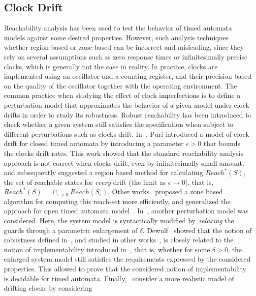 \subsection{Clock Drift}

Reachability analysis has been used to test the behavior
of timed automata models against some desired properties. However, such analysis
techniques whether region-based or zone-based can be incorrect and misleading,
since they rely on several assumptions such as zero response times or infinitesimally  
precise clocks, which is generally not the case in reality. In practice, clocks are 
implemented using an oscillator and a counting register, and their precision based on 
the quality of the oscillator together with the operating environment.
The common practice when studying the effect of clock imperfections is to define a perturbation
model that approximates the behavior of a given model under clock drifts in order to study its 
robustness. 
Robust reachability has been introduced to check whether a given
system still satisfies the specification when
subject to different perturbations such as clocks drift.
In~\cite{drift:puri}, Puri introduced a model of clock drift for closed timed automata
by introducing a parameter $\epsilon>0$ that bounds the clocks drift rates.
This work showed that the standard reachability analysis approach is not correct
when clocks drift, even by infinitesimally small amount, and subsequently suggested a region based
method for calculating $Reach^*(S)$, the set of reachable states for \emph{every} drift 
(the limit as $\epsilon\to 0$),
that is, $Reach^*(S)=\cap_{\epsilon>0} Reach(S_{\epsilon})$. Other 
works~\cite{drift:conrad,drift:puriR} proposed a zone based algorithm for computing this 
reach-set more efficiently, and generalized the approach for open timed automata 
model~\cite{drift:puriR}.
In~\cite{drift:wulf,drift:puri}, another perturbation model was considered. Here, 
the system model is syntactically modified by~\emph{relaxing} the guards through 
a parametric enlargement of $\delta$.
Dewulf~\cite{drift:wulf} showed that the notion of robustness defined in~\cite{drift:puri}, and
studied in other works~\cite{drift:conrad, drift:puriR}, is closely related to the notion of 
implementability introduced in~\cite{drift:wulf}, that is, whether for some $\delta>0$,
the enlarged system model still satisfies the requirements expressed by the considered properties.
This allowed to prove that the considered notion of implementability is decidable 
for timed automata.
Finally,~\cite{drift:surp} consider a more realistic model of drifting clocks by considering 
